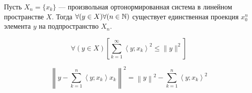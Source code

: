 \begin{teorema}
Пусть $X_n=\{x_k\}$ --- произвольная ортонормированная система в линейном пространстве $X$.
Тогда $\forall(y\in X)\forall(n\in\mathbb{N})$ существует единственная проекция $x_0^n$ элемента $y$ на подпространство $X_n$.
\end{teorema}


\begin{sledstvie}
$$
\forall(y\in X)\left[ \sum_{k=1}^\infty \left< y; x_k \right>^2 \leq \|y\|^2 \right]
$$
\end{sledstvie}

\begin{sledstvie}
$$
\left\|y-\sum_{k=1}^n \left<y; x_k\right> x_k \right\|^2 = \left\|y\right\|^2-\sum_{k=1}^n \left<y; x_k\right>^2
$$
\end{sledstvie}

